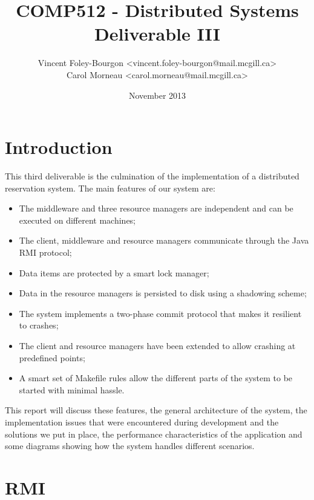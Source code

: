 \documentclass[11pt]{article}
\begin{document}
\title{COMP512 - Distributed Systems \\ Deliverable III}
\author{
  Vincent Foley-Bourgon <vincent.foley-bourgon@mail.mcgill.ca> \\
  Carol Morneau <carol.morneau@mail.mcgill.ca>
}
\date{November 2013}

\maketitle

\tableofcontents


\section{Introduction}

This third deliverable is the culmination of the implementation of a
distributed reservation system.  The main features of our system are:

\begin{itemize}
  \item The middleware and three resource managers are independent and
    can be executed on different machines;
  \item The client, middleware and resource managers communicate
    through the Java RMI protocol;
  \item Data items are protected by a smart lock manager;
  \item Data in the resource managers is persisted to disk using a
    shadowing scheme;
  \item The system implements a two-phase commit protocol that makes
    it resilient to crashes;
  \item The client and resource managers have been extended to allow
    crashing at predefined points;
  \item A smart set of Makefile rules allow the different parts of the
    system to be started with minimal hassle.
\end{itemize}

This report will discuss these features, the general architecture of
the system, the implementation issues that were encountered during
development and the solutions we put in place, the performance
characteristics of the application and some diagrams showing how the
system handles different scenarios.


\section{RMI}
\end{document}
